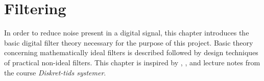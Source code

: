 \chapter{Filtering} \label{ch8}
In order to reduce noise present in a digital signal, this chapter introduces the basic digital filter theory necessary for the purpose of this project. Basic theory concerning mathematically ideal filters is described followed by design techniques of practical non-ideal filters. This chapter is inspired by \cite{chapters 5, 7, DTSP}, \cite{section 3.4.4, FSP}, and lecture notes from the course \textit{Diskret-tids systemer}.




